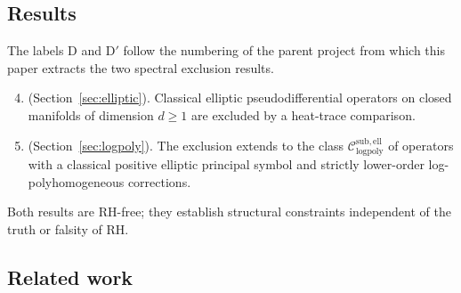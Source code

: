 \documentclass[12pt]{amsart}
\newcommand{\Csub}{\mathcal{C}_{\mathrm{logpoly}}^{\mathrm{sub,ell}}}
\begin{document}
\subsection*{Results}

The labels D and D$'$ follow the numbering of the parent project from
which this paper extracts the two spectral exclusion results.
\begin{enumerate}[label=(\textbf{\Alph*})]
  \setcounter{enumi}{3}
  \item[\textbf{D}] (Section~\ref{sec:elliptic}).  Classical elliptic
    pseudodifferential operators on closed manifolds of dimension $d\ge 1$
    are excluded by a heat-trace comparison.
  \item[\textbf{D$'$}] (Section~\ref{sec:logpoly}).  The exclusion
    extends to the class $\Csub$ of operators with a classical positive
    elliptic principal symbol and strictly lower-order
    log-polyhomogeneous corrections.
\end{enumerate}

Both results are RH-free; they establish structural constraints
independent of the truth or falsity of RH.

\subsection*{Related work}
\end{document}
